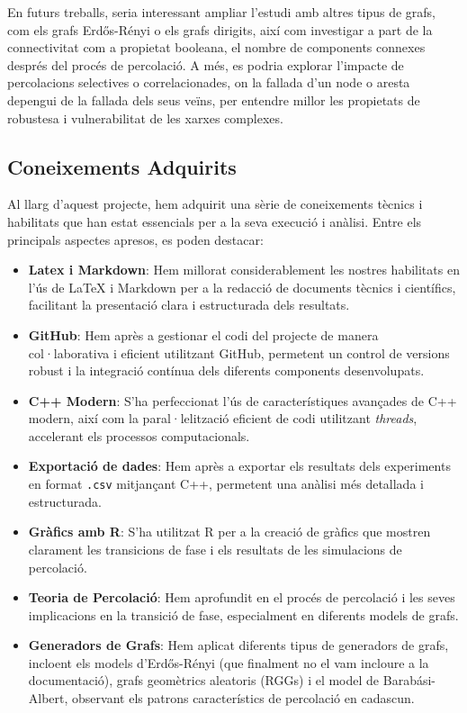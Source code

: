 \documentclass[a4paper]{article}
\begin{document}
	En futurs treballs, seria interessant ampliar l'estudi amb altres tipus de grafs, com els grafs Erdős-Rényi o els grafs dirigits, així com investigar a part de la connectivitat com a propietat booleana, el nombre de components connexes després del procés de percolació. A més, es podria explorar l'impacte de percolacions selectives o correlacionades, on la fallada d'un node o aresta depengui de la fallada dels seus veïns, per entendre millor les propietats de robustesa i vulnerabilitat de les xarxes complexes.
	
	\subsection{Coneixements Adquirits}
	
	Al llarg d'aquest projecte, hem adquirit una sèrie de coneixements tècnics i habilitats que han estat essencials per a la seva execució i anàlisi. Entre els principals aspectes apresos, es poden destacar:
	
	\begin{itemize}
		\item \textbf{Latex i Markdown}: Hem millorat considerablement les nostres habilitats en l'ús de \LaTeX{} i Markdown per a la redacció de documents tècnics i científics, facilitant la presentació clara i estructurada dels resultats.
		\item \textbf{GitHub}: Hem après a gestionar el codi del projecte de manera col·laborativa i eficient utilitzant GitHub, permetent un control de versions robust i la integració contínua dels diferents components desenvolupats.
		\item \textbf{C++ Modern}: S'ha perfeccionat l'ús de característiques avançades de C++ modern, així com la paral·lelització eficient de codi utilitzant \textit{threads}, accelerant els processos computacionals.
		\item \textbf{Exportació de dades}: Hem après a exportar els resultats dels experiments en format \texttt{.csv} mitjançant C++, permetent una anàlisi més detallada i estructurada.
		\item \textbf{Gràfics amb R}: S'ha utilitzat R per a la creació de gràfics que mostren clarament les transicions de fase i els resultats de les simulacions de percolació.
		\item \textbf{Teoria de Percolació}: Hem aprofundit en el procés de percolació i les seves implicacions en la transició de fase, especialment en diferents models de grafs.
		\item \textbf{Generadors de Grafs}: Hem aplicat diferents tipus de generadors de grafs, incloent els models d'Erdős-Rényi (que finalment no el vam incloure a la documentació), grafs geomètrics aleatoris (RGGs) i el model de Barabási-Albert, observant els patrons característics de percolació en cadascun.
	\end{itemize}
	
\end{document}
